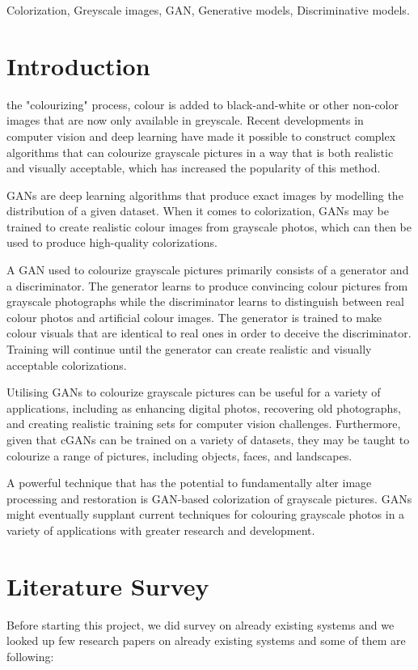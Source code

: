 \documentclass[conference]{IEEEtran}
\begin{document}
\begin{IEEEkeywords}\label{Keywords}
Colorization, Greyscale images, GAN, Generative models, Discriminative models.
\end{IEEEkeywords}

\section{Introduction}\label{Introduction}
 the "colourizing" process, colour is added to black-and-white or other non-color images that are now only available in greyscale. Recent developments in computer vision and deep learning have made it possible to construct complex algorithms that can colourize grayscale pictures in a way that is both realistic and visually acceptable, which has increased the popularity of this method.

GANs are deep learning algorithms that produce exact images by modelling the distribution of a given dataset. When it comes to colorization, GANs may be trained to create realistic colour images from grayscale photos, which can then be used to produce high-quality colorizations.

A GAN used to colourize grayscale pictures primarily consists of a generator and a discriminator. The generator learns to produce convincing colour pictures from grayscale photographs while the discriminator learns to distinguish between real colour photos and artificial colour images. The generator is trained to make colour visuals that are identical to real ones in order to deceive the discriminator. Training will continue until the generator can create realistic and visually acceptable colorizations.

Utilising GANs to colourize grayscale pictures can be useful for a variety of applications, including as enhancing digital photos, recovering old photographs, and creating realistic training sets for computer vision challenges. Furthermore, given that cGANs can be trained on a variety of datasets, they may be taught to colourize a range of pictures, including objects, faces, and landscapes.

A powerful technique that has the potential to fundamentally alter image processing and restoration is GAN-based colorization of grayscale pictures. GANs might eventually supplant current techniques for colouring grayscale photos in a variety of applications with greater research and development.

\section{Literature Survey}\label{Literature Survey}
Before starting this project, we did survey on already existing systems and we looked up few research papers on already existing systems and some of them are following:
\end{document}
